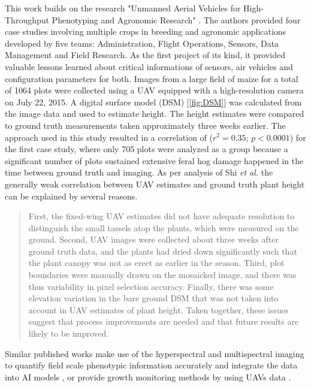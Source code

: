 This work builds on the research "Unmanned Aerial Vehicles for High-Throughput Phenotyping and Agronomic Research" \cite{UAV_HTPAR_2016}.
The authors provided four case studies involving multiple crops in breeding and agronomic applications developed by five teams: Administration, Flight Operations, Sensors, Data Management and Field Research. As the first project of its kind, it provided valuable lessons learned about critical informations of sensors, air vehicles and configuration parameters for both.
Images from a large field of maize for a total of 1064 plots were collected using a UAV equipped with a high-resolution camera on July 22, 2015.
A digital surface model (DSM) [\ref{fig:DSM}] was calculated from the image data and used to estimate height. The height estimates were compared to ground truth measurements taken approximately three weeks earlier.
The approach used in this study resulted in a correlation of ($r^2 = 0.35$; $p<0.0001$) for the first case study, where only 705 plots were analyzed as a group because a significant number of plots sustained extensive feral hog damage happened in the time between ground truth and imaging.
As per analysis of Shi \textit{et al.}\cite{UAV_HTPAR_2016} the generally weak correlation between UAV estimates and ground truth plant height can be explained by several reasons.
\begin{quote}
    First, the fixed-wing UAV estimates did not have adequate resolution to distinguish the small tassels atop the plants, which were measured on the ground. Second, UAV images were collected about three weeks after ground truth data, and the plants had dried down significantly such that the plant canopy was not as erect as earlier in the season. Third, plot boundaries were manually drawn on the mosaicked image, and there was thus variability in pixel selection accuracy. Finally, there was some elevation variation in the bare ground DSM that was not taken into account in UAV estimates of plant height. Taken together, these issues suggest that process improvements are needed and that future results are likely to be improved.
\end{quote}
Similar published works make use of the hyperspectral and multispectral imaging to  quantify field scale phenotypic information accurately and integrate the data into AI models \cite{jung2021potential}, or provide growth monitoring methods by using UAVs data \cite{chang2017crop}.